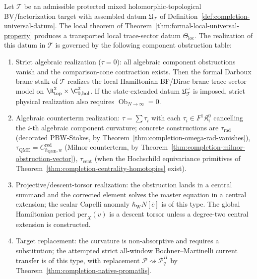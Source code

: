 \begin{thm}
\label{thm:completion-universal-formal-brane}
Let \(\mathcal T\) be an admissible protected mixed holomorphic-topological
BV/factorization target with assembled datum \(\mathfrak U_{\mathcal T}\)
of Definition~\ref{def:completion-universal-datum}.  The local
theorem of Theorem~\ref{thm:formal-local-universal-property}
produces a transported local trace-sector datum
\(\Theta_{\mathrm{loc}}\).  The realization of this datum in
\(\mathcal T\) is governed by the following component obstruction
table:
\begin{enumerate}
\item Strict algebraic realization (\(\tau=0\)): all algebraic component
  obstructions vanish and the comparison-cone contraction exists.
  Then the formal Darboux brane stalk of \(\mathcal T\) realizes the
  local Hamiltonian BF/Dirac-brane trace-sector model on
  \(\R^2_{\mathrm{top}}\times\C^2_{0,\mathrm{hol}}\).  If the
  state-extended datum \(\mathfrak U^\omega_{\mathcal T}\) is imposed,
  strict physical realization also requires
  \(\operatorname{Ob}_{N\to\infty}=0\).
\item Algebraic counterterm realization: \(\tau=\sum\tau_i\) with each
  \(\tau_i\in F^1\mathfrak K^0_i\) cancelling the \(i\)-th algebraic
  component curvature; concrete constructions are
  \(\tau_{\mathrm{rad}}\) (decorated PBW-Stokes, by
  Theorem~\ref{thm:completion-omega-rad-vanishes}),
  \(\tau_{\mathrm{QME}}=C^{\mathrm{red}}_{\hbar_{\mathrm{QME}},w}\) (Milnor
  counterterm, by
  Theorem~\ref{thm:completion-milnor-obstruction-vector}),
  \(\tau_{\mathrm{cent}}\) (when the Hochschild equivariance
  primitives of
  Theorem~\ref{thm:completion-centrality-homotopies} exist).
\item Projective/descent-torsor realization: the obstruction lands in a
  central summand and the corrected element solves the master
  equation in a central extension; the scalar Capelli anomaly
  \(\hbar_{\mathrm{W}}N[\bar c]\) is of this type.  The global Hamiltonian period
  \(\mathrm{per}_X(v)\) is a descent torsor unless a degree-two
  central extension is constructed.
\item Target replacement: the curvature is non-absorptive and
  requires a substitution; the attempted strict all-window
  Bochner--Martinelli current transfer is of this type, with
  replacement \(\mathcal P\rightsquigarrow\mathcal P^\Pi_q\) by
  Theorem~\ref{thm:completion-native-promatlis}.
\end{enumerate}

\end{thm}
